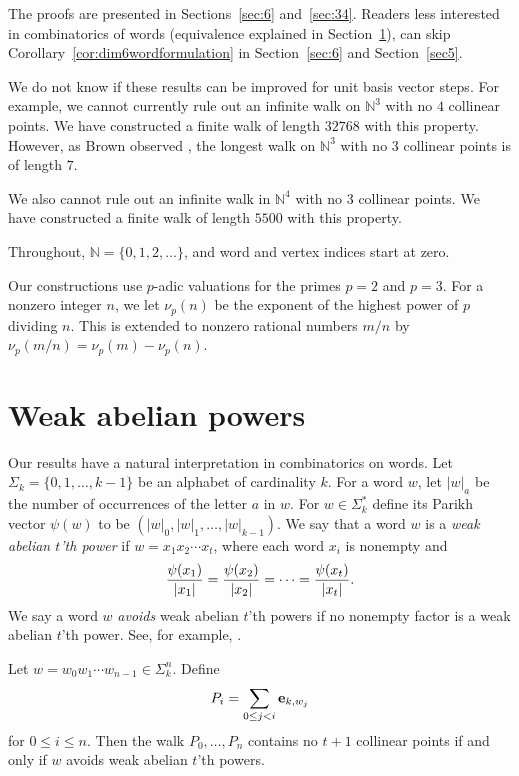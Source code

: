 \documentclass[12pt,reqno]{article}
\newcommand{\N}{\mathbb N}
\begin{document}
The proofs are presented in Sections~\ref{sec:6} and~\ref{sec:34}.
Readers less interested in combinatorics of words (equivalence explained in Section~\ref{sec2}), can skip Corollary~\ref{cor:dim6wordformulation} in Section~\ref{sec:6}
and Section~\ref{sec5}.

We do not know if these results can be improved for unit basis vector steps.  For example, we cannot currently rule out an infinite walk on $\N^3$ with
no $4$ collinear points.  We have
constructed a finite walk of length $32768$ with this property.   However, as Brown observed \cite{Bro71a}, the longest
walk on $\N^3$ with no $3$ collinear points is of length $7$.

We also cannot rule out an infinite walk
in $\N^4$ with no $3$ collinear points.  We have constructed a finite walk of length $5500$ with this property.

Throughout, $\N=\{0,1,2,\ldots\}$, and word and vertex indices start
at zero.

Our constructions use $p$-adic valuations for the primes $p =2$ and $p = 3$.  For a nonzero integer $n$, we let $\nu_p (n)$ be the exponent of the highest power of $p$ dividing $n$. This is extended to nonzero rational numbers $m/n$ by
$\nu_p(m/n) = \nu_p(m) - \nu_p (n)$.

\section{Weak abelian powers}
\label{sec2}

Our results have a natural interpretation in combinatorics on words.  Let $\Sigma_k = \{0,1,\ldots, k-1\}$ be an alphabet of cardinality $k$.  For a word $w$, let
$|w|_a$ be the number of occurrences of
the letter $a$ in $w$.  For
$w \in \Sigma_k^*$ define
its Parikh vector
$\psi(w)$ to be $(|w|_0, |w|_1, \ldots,
|w|_{k-1})$.
We say that
a word $w$ is a {\it weak abelian $t$'th power} if $w = x_1 x_2 \cdots x_t$, where
each word $x_i$ is nonempty and
$${{\psi(x_1)} \over {|x_1|}} = 
{{\psi(x_2)} \over {|x_2|}} = \cdots =
{{\psi(x_t)} \over {|x_t|}}.$$
We say a word $w$ {\it avoids\/} weak abelian $t$'th powers if no nonempty factor is a weak abelian $t$'th power.  See, for example, \cite{AP16,FP23}.

\begin{proposition}
Let $w=w_0w_1\cdots w_{n-1}\in\Sigma_k^n$. Define
\[
P_i=\sum_{0 \leq j < i}{\bf e}_{k,w_j}
\]
for $0 \leq i \leq n$.
Then the walk $ P_0,\ldots,P_n$ contains no $t+1$ 
collinear points if and only if $w$ avoids weak abelian $t$'th powers.
\label{prop1}
\end{proposition}
\end{document}
